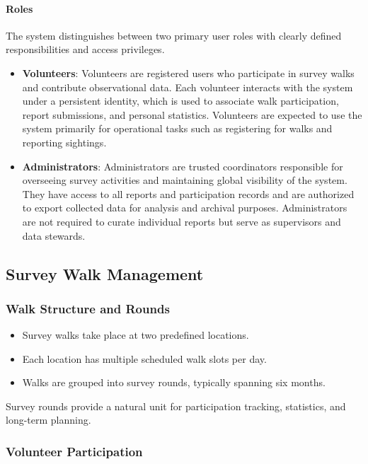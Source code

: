 \documentclass[11pt]{article}
\begin{document}
\paragraph{Roles}
The system distinguishes between two primary user roles with clearly defined responsibilities and access privileges.

\begin{itemize}
    \item \textbf{Volunteers}: Volunteers are registered users who participate in survey walks and contribute observational data. Each volunteer interacts with the system under a persistent identity, which is used to associate walk participation, report submissions, and personal statistics. Volunteers are expected to use the system primarily for operational tasks such as registering for walks and reporting sightings.
    \item \textbf{Administrators}: Administrators are trusted coordinators responsible for overseeing survey activities and maintaining global visibility of the system. They have access to all reports and participation records and are authorized to export collected data for analysis and archival purposes. Administrators are not required to curate individual reports but serve as supervisors and data stewards.

\end{itemize}


\subsection{Survey Walk Management}

\subsubsection{Walk Structure and Rounds}

\begin{itemize}
    \item Survey walks take place at two predefined locations.
    \item Each location has multiple scheduled walk slots per day.
    \item Walks are grouped into survey rounds, typically spanning six months.
\end{itemize}

Survey rounds provide a natural unit for participation tracking, statistics, and long-term planning.

\subsubsection{Volunteer Participation}
\end{document}
